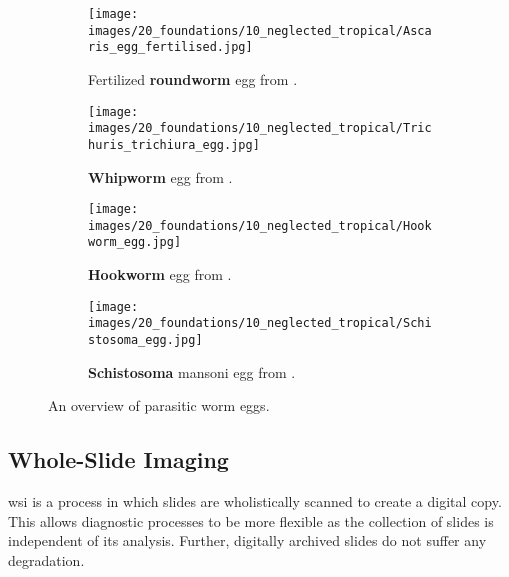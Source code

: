 \begin{figure}[tb]
    \centering
    \begin{subfigure}[t]{0.45\textwidth}
        \centering
        \texttt{[image: images/20\_foundations/10\_neglected\_tropical/Ascaris\_egg\_fertilised.jpg]}
        \caption{Fertilized \textbf{roundworm} egg from \textcite{dpdx2019ascariasis}.}
        \label{fig:Foundations:NCLs:Diagnosis:Ascaris:Egg}
        \vspace*{2mm}
    \end{subfigure}
    \begin{subfigure}[t]{0.45\textwidth}
        \centering
        \texttt{[image: images/20\_foundations/10\_neglected\_tropical/Trichuris\_trichiura\_egg.jpg]}
        \caption{\textbf{Whipworm} egg from \textcite{dpdx2017trichuriasis}.}
        \label{fig:Foundations:NCLs:Diagnosis:Whipworm:Egg}
        \vspace*{2mm}
    \end{subfigure}

    \begin{subfigure}[t]{0.45\textwidth}
        \centering
        \texttt{[image: images/20\_foundations/10\_neglected\_tropical/Hookworm\_egg.jpg]}
        \caption{\textbf{Hookworm} egg from \textcite{dpdx2019hookworm}.}
        \label{fig:Foundations:NCLs:Diagnosis:Hookworm:Egg}
    \end{subfigure}
    \begin{subfigure}[t]{0.45\textwidth}
        \centering
        \texttt{[image: images/20\_foundations/10\_neglected\_tropical/Schistosoma\_egg.jpg]}
        \caption{\textbf{Schistosoma} mansoni egg from \textcite{dpdx2019hookworm}.}
        \label{fig:Foundations:NCLs:Diagnosis:Schistosoma:Egg}
    \end{subfigure}
    \caption{An overview of parasitic worm eggs.}
    \label{fig:Foundations:NCLs:Diagnosis:Overview}
\end{figure}

\subsection{Whole-Slide Imaging}
\label{sec:Foundations:NTDs:WHoleSlideImaging}

\Ac{wsi} \cite{ghaznavi2013digital, hanna2019whole, el-gabry2014wholeslide} is a process in which slides are wholistically scanned to create a digital copy. This allows diagnostic processes to be more flexible as the collection of slides is independent of its analysis. Further, digitally archived slides do not suffer any degradation. 


